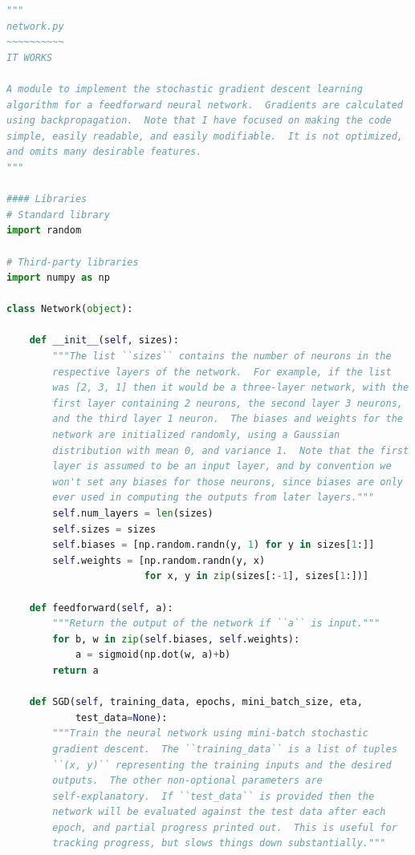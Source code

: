 \begin{lstlisting}[caption={network.py (Python 3.7.1)},label={lst:network.py}, language=Python]
"""
network.py
~~~~~~~~~~
IT WORKS

A module to implement the stochastic gradient descent learning
algorithm for a feedforward neural network.  Gradients are calculated
using backpropagation.  Note that I have focused on making the code
simple, easily readable, and easily modifiable.  It is not optimized,
and omits many desirable features.
"""

#### Libraries
# Standard library
import random

# Third-party libraries
import numpy as np

class Network(object):

    def __init__(self, sizes):
        """The list ``sizes`` contains the number of neurons in the
        respective layers of the network.  For example, if the list
        was [2, 3, 1] then it would be a three-layer network, with the
        first layer containing 2 neurons, the second layer 3 neurons,
        and the third layer 1 neuron.  The biases and weights for the
        network are initialized randomly, using a Gaussian
        distribution with mean 0, and variance 1.  Note that the first
        layer is assumed to be an input layer, and by convention we
        won't set any biases for those neurons, since biases are only
        ever used in computing the outputs from later layers."""
        self.num_layers = len(sizes)
        self.sizes = sizes
        self.biases = [np.random.randn(y, 1) for y in sizes[1:]]
        self.weights = [np.random.randn(y, x)
                        for x, y in zip(sizes[:-1], sizes[1:])]

    def feedforward(self, a):
        """Return the output of the network if ``a`` is input."""
        for b, w in zip(self.biases, self.weights):
            a = sigmoid(np.dot(w, a)+b)
        return a

    def SGD(self, training_data, epochs, mini_batch_size, eta,
            test_data=None):
        """Train the neural network using mini-batch stochastic
        gradient descent.  The ``training_data`` is a list of tuples
        ``(x, y)`` representing the training inputs and the desired
        outputs.  The other non-optional parameters are
        self-explanatory.  If ``test_data`` is provided then the
        network will be evaluated against the test data after each
        epoch, and partial progress printed out.  This is useful for
        tracking progress, but slows things down substantially."""


\end{lstlisting}
